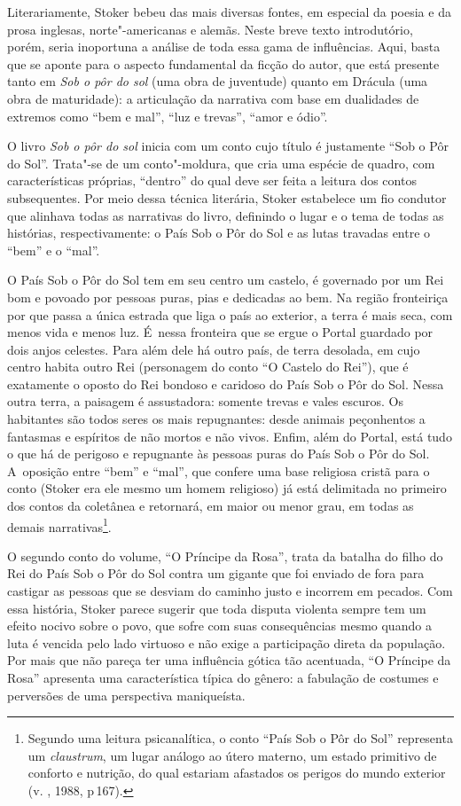 Literariamente, Stoker bebeu das mais diversas fontes, em especial da
poesia e da prosa inglesas, norte"-americanas e alemãs. Neste breve texto
introdutório, porém, seria inoportuna a análise de toda essa gama de
influências. Aqui, basta que se aponte para o aspecto fundamental da
ficção do autor, que está presente tanto em \emph{Sob o pôr do sol} (uma
obra de juventude) quanto em Drácula (uma obra de maturidade): a
articulação da narrativa com base em dualidades de extremos como ``bem e
mal'', ``luz e trevas'', ``amor e ódio''.

O livro \emph{Sob o pôr do sol} inicia com um conto cujo título é
justamente ``Sob o Pôr do Sol''. Trata"-se de um conto"-moldura, que cria
uma espécie de quadro, com características próprias, ``dentro'' do qual
deve ser feita a leitura dos contos subsequentes. Por meio dessa técnica
literária, Stoker estabelece um fio condutor que alinhava todas as
narrativas do livro, definindo o lugar e o tema de todas as histórias,
respectivamente: o País Sob o Pôr do Sol e as lutas travadas entre o
``bem'' e o ``mal''.

O País Sob o Pôr do Sol tem em seu centro um castelo, é governado por um
Rei bom e povoado por pessoas puras, pias e dedicadas ao bem. Na região
fronteiriça por que passa a única estrada que liga o país ao exterior, a
terra é mais seca, com menos vida e menos luz. É~nessa fronteira que se
ergue o Portal guardado por dois anjos celestes. Para além dele há outro
país, de terra desolada, em cujo centro habita outro Rei (personagem do
conto ``O Castelo do Rei''), que é exatamente o oposto do Rei bondoso e
caridoso do País Sob o Pôr do Sol. Nessa outra terra, a paisagem é
assustadora: somente trevas e vales escuros. Os habitantes são todos
seres os mais repugnantes: desde animais peçonhentos a fantasmas e
espíritos de não mortos e não vivos. Enfim, além do Portal, está tudo o
que há de perigoso e repugnante às pessoas puras do País Sob o Pôr do
Sol. A~oposição entre ``bem'' e ``mal'', que confere uma base religiosa
cristã para o conto (Stoker era ele mesmo um homem religioso) já está
delimitada no primeiro dos contos da coletânea e retornará, em maior ou
menor grau, em todas as demais narrativas\footnote{Segundo uma leitura psicanalítica, o conto
``País Sob o Pôr do Sol'' representa um \emph{claustrum}, um lugar
análogo ao útero materno, um estado primitivo de conforto e nutrição, do
qual estariam afastados os perigos do mundo exterior (v. , 1988,
p\,167).}.

O segundo conto do volume, ``O Príncipe da Rosa'', trata da batalha do
filho do Rei do País Sob o Pôr do Sol contra um gigante que foi enviado
de fora para castigar as pessoas que se desviam do caminho justo e
incorrem em pecados. Com essa história, Stoker parece sugerir que toda
disputa violenta sempre tem um efeito nocivo sobre o povo, que sofre com
suas consequências mesmo quando a luta é vencida pelo lado virtuoso e
não exige a participação direta da população. Por mais que não pareça
ter uma influência gótica tão acentuada, ``O Príncipe da Rosa''
apresenta uma característica típica do gênero: a fabulação de costumes e
perversões de uma perspectiva maniqueísta.

